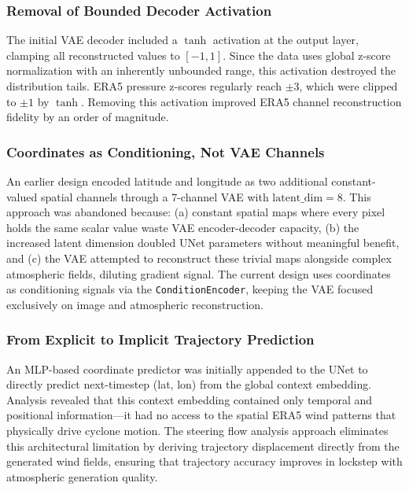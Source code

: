 \documentclass[12pt, a4paper]{article}
\begin{document}
\subsubsection{Removal of Bounded Decoder Activation}
The initial VAE decoder included a $\tanh$ activation at the output layer, clamping all reconstructed values to $[-1, 1]$. Since the data uses global z-score normalization with an inherently unbounded range, this activation destroyed the distribution tails. ERA5 pressure z-scores regularly reach $\pm 3$, which were clipped to $\pm 1$ by $\tanh$. Removing this activation improved ERA5 channel reconstruction fidelity by an order of magnitude.

\subsubsection{Coordinates as Conditioning, Not VAE Channels}
An earlier design encoded latitude and longitude as two additional constant-valued spatial channels through a 7-channel VAE with $\text{latent\_dim}=8$. This approach was abandoned because: (a) constant spatial maps where every pixel holds the same scalar value waste VAE encoder-decoder capacity, (b) the increased latent dimension doubled UNet parameters without meaningful benefit, and (c) the VAE attempted to reconstruct these trivial maps alongside complex atmospheric fields, diluting gradient signal. The current design uses coordinates as conditioning signals via the \texttt{ConditionEncoder}, keeping the VAE focused exclusively on image and atmospheric reconstruction.

\subsubsection{From Explicit to Implicit Trajectory Prediction}
An MLP-based coordinate predictor was initially appended to the UNet to directly predict next-timestep (lat, lon) from the global context embedding. Analysis revealed that this context embedding contained only temporal and positional information---it had no access to the spatial ERA5 wind patterns that physically drive cyclone motion. The steering flow analysis approach eliminates this architectural limitation by deriving trajectory displacement directly from the generated wind fields, ensuring that trajectory accuracy improves in lockstep with atmospheric generation quality.


\end{document}
